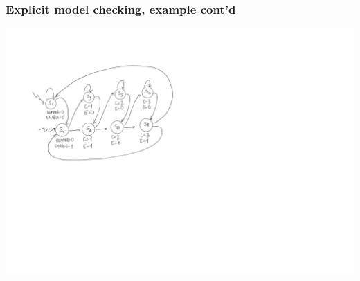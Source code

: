 \documentclass[usenames,dvipsnames]{beamer}
\begin{document}

\begin{frame}
  \frametitle{Explicit model checking, example cont'd}
  
  \centering
  \includegraphics[scale=.7]{fsm}
  
\end{frame}

\end{document}
